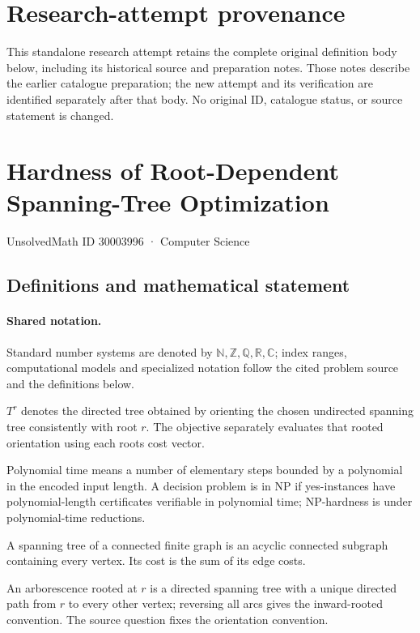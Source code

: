 \documentclass[11pt]{article}
\begin{document}
\section*{Research-attempt provenance}
This standalone research attempt retains the complete original definition body below,
including its historical source and preparation notes. Those notes describe the
earlier catalogue preparation; the new attempt and its verification are identified
separately after that body. No original ID, catalogue status, or source statement is changed.

\section{Hardness of Root-Dependent Spanning-Tree Optimization}\label{30003996}
{\small UnsolvedMath ID 30003996 · Computer Science}
\subsection{Definitions and mathematical statement}

\paragraph{Shared notation.}Standard number systems are denoted by $\mathbb N,\mathbb Z,\mathbb Q,\mathbb R,\mathbb C$; index ranges, computational models and specialized notation follow the cited problem source and the definitions below.


$T^r$ denotes the directed tree obtained by orienting the chosen undirected spanning tree consistently with root $r$. The objective separately evaluates that rooted orientation using each root\textquotesingle s cost vector.

Polynomial time means a number of elementary steps bounded by a polynomial in the encoded input length. A decision problem is in $\mathrm{NP}$ if yes-instances have polynomial-length certificates verifiable in polynomial time; NP-hardness is under polynomial-time reductions.

A spanning tree of a connected finite graph is an acyclic connected subgraph containing every vertex. Its cost is the sum of its edge costs.

An arborescence rooted at $r$ is a directed spanning tree with a unique directed path from $r$ to every other vertex; reversing all arcs gives the inward-rooted convention. The source question fixes the orientation convention.
\end{document}

